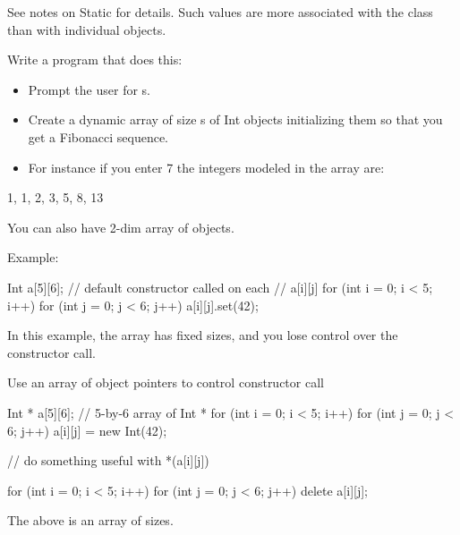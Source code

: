 See notes on Static for details. Such values are more associated with
the class than with individual objects.

\begin{ex}
Write a program that does this:

\begin{itemize}
\item
  Prompt the user for s.
\item
  Create a dynamic array of size s of Int objects initializing them so
  that you get a Fibonacci sequence.
\item
  For instance if you enter 7 the integers modeled in the array are:
\end{itemize}
\begin{center}
1, 1, 2, 3, 5, 8, 13
\end{center}
You can also have 2-dim array of objects.

Example:
\begin{console}
Int a[5][6]; // default constructor called on each
             // a[i][j]
for (int i = 0; i < 5; i++)
    for (int j = 0; j < 6; j++)
        a[i][j].set(42);
\end{console}
\end{ex}
In this example, the array has fixed sizes, and you lose control over
the constructor call.

Use an array of object pointers to control constructor call
\begin{console}
Int * a[5][6]; // 5-by-6 array of Int *
for (int i = 0; i < 5; i++)
    for (int j = 0; j < 6; j++)
        a[i][j] = new Int(42);

// do something useful with *(a[i][j])

for (int i = 0; i < 5; i++)
    for (int j = 0; j < 6; j++)
        delete a[i][j];
\end{console}
The above is an array of  sizes.

